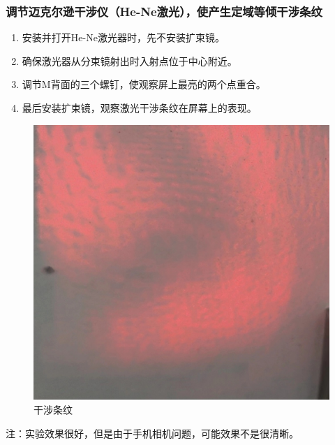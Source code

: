 \documentclass[dvipsnames, svgnames,a4paper,11pt]{article}
\begin{document}
	\subsubsection{调节迈克尔逊干涉仪（He-Ne激光），使产生定域等倾干涉条纹}
	\begin{enumerate}
		\item 安装并打开He-Ne激光器时，先不安装扩束镜。
		\item 确保激光器从分束镜射出时入射点位于中心附近。
		\item 调节M背面的三个螺钉，使观察屏上最亮的两个点重合。
		\item 最后安装扩束镜，观察激光干涉条纹在屏幕上的表现。
	\end{enumerate}
	\begin{figure}[H]
		\centering
		\includegraphics[width=0.4\linewidth]{images/等倾干涉}
		\caption{干涉条纹}
		\label{干涉条纹}
	\end{figure}
	注：实验效果很好，但是由于手机相机问题，可能效果不是很清晰。
\end{document}
